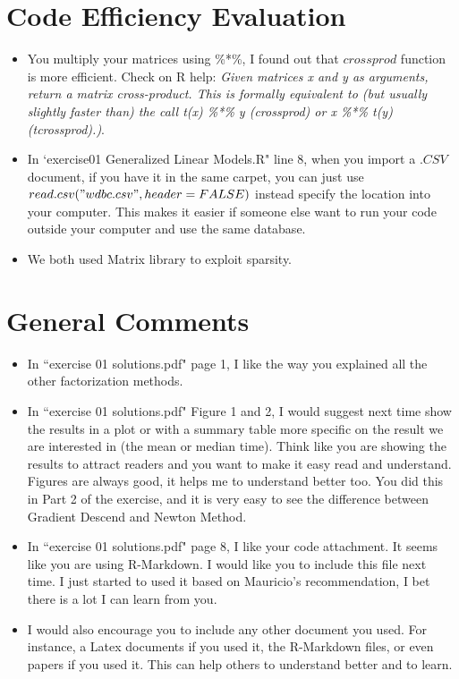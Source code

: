 \documentclass[11 pt]{article}
\begin{document}
\section{Code Efficiency Evaluation}

\begin{itemize}
	\item You multiply your matrices using \%*\%, I found out that $crossprod$ function is more efficient. Check on R help: \textit{Given matrices x and y as arguments, return a matrix cross-product. This is formally equivalent to (but usually slightly faster than) the call t(x) \%*\% y (crossprod) or x \%*\% t(y) (tcrossprod).)}.
	\item In `exercise01 Generalized Linear Models.R" line 8, when you import a $.CSV$ document, if you have it in the same carpet, you can just use $read.csv("wdbc.csv", header = FALSE)$ instead specify  the location into your computer. This makes it easier if someone else want to run your code outside your computer and use the same database. 
	\item We both used Matrix library to exploit sparsity.
\end{itemize}

\section{General Comments}
\begin{itemize}
	\item In ``exercise 01 solutions.pdf" page 1, I like the way you explained all the other factorization methods.
	\item In ``exercise 01 solutions.pdf" Figure 1 and 2, I would suggest next time show the results in a plot or with a summary table more specific on the result we are interested in (the mean or median time). Think like you are showing the results to attract readers and you want to make it easy read and understand. Figures are always good, it helps me to understand better too. You did this in Part 2 of the exercise, and it is very easy to see the difference between Gradient Descend and Newton Method.
	\item In ``exercise 01 solutions.pdf" page 8, I like your code attachment. It seems like you are using R-Markdown. I would like you to include this file next time. I just started to used it based on Mauricio's recommendation, I bet there is a lot I can learn from you. 
	\item I would also encourage you to include any other document you used. For instance, a Latex documents if you used it, the R-Markdown files, or even papers if you used it. This can help others to understand better and to learn. 

	
\end{itemize}
\end{document}
